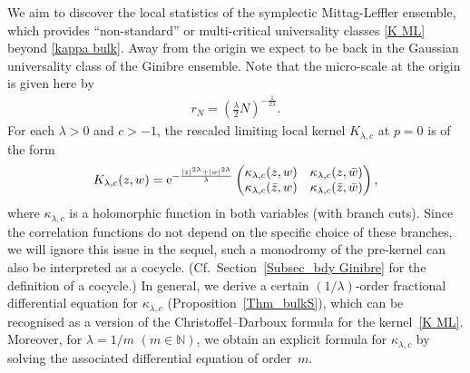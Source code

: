 \documentclass[pdftex]{sigma}
\numberwithin{equation}{section}
\newcommand{\1}{\chi}
\begin{document}
We aim to discover the local statistics of the symplectic Mittag-Leffler ensemble, which provides ``non-standard'' or multi-critical universality classes \eqref{K ML} beyond \eqref{kappa bulk}.
Away from the origin we expect to be back in the Gaussian universality class of the Ginibre ensemble.
Note that the micro-scale at the origin is given here by
\begin{gather} \label{micro scale ML}
	r_N=\left(\frac{\lambda}{2}N\right)^{-\frac{1}{2\lambda}}.
\end{gather}
For each $\lambda>0$ and $c>-1$, the rescaled limiting local kernel $K_{\lambda,c}$ at $p=0$ is of the form
\begin{gather} \label{K ML}
	K_{\lambda,c}(z,w)
	={\rm e}^{ -\frac{ |z|^{2\lambda}+|w|^{2\lambda} }{\lambda} } \begin{pmatrix}
		\kappa_{\lambda,c}(z,w) & \kappa_{\lambda,c}(z,\bar{w}) \\
		\kappa_{\lambda,c}(\bar{z},w) & \kappa_{\lambda,c}(\bar{z},\bar{w})
	\end{pmatrix} ,
\end{gather}
where $\kappa_{\lambda,c}$ is a holomorphic function in both variables (with branch cuts).
Since the correlation functions do not depend on the specific choice of these branches, we will ignore this issue in the sequel, such a monodromy of the pre-kernel can also be interpreted as a cocycle. (Cf.\ Section~\ref{Subsec_bdy Ginibre} for the definition of a cocycle.)
In general, we derive a certain $(1/\lambda)$-order fractional differential equation for $\kappa_{\lambda,c}$ (Proposition~\ref{Thm_bulkS}), which can be recognised as a version of the Christoffel--Darboux formula for the kernel~\eqref{K ML}.
Moreover, for $\lambda=1/m$ $(m\in \mathbb{N})$, we obtain an explicit formula for $\kappa_{\lambda,c}$ by solving the associated differential equation of order~$m$.
\end{document}

